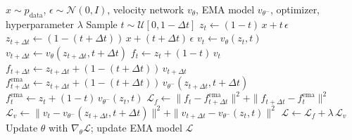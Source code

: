\begin{algorithm}[htbp]
\caption{Consistency Flow Matching Training}
\label{alg:consistency_fm}
\begin{algorithmic}[1]
\Require $x \sim p_{\text{data}}$, $\epsilon \sim \mathcal{N}(0,I)$, velocity network $v_\theta$, EMA model $v_{\theta^-}$, optimizer, hyperparameter $\lambda$
\State Sample $t \sim \mathcal{U}[0, 1 - \Delta t]$
\State $z_t \gets (1 - t) \, x + t \, \epsilon$
\State $z_{t+\Delta t} \gets (1 - (t+\Delta t)) \, x + (t+\Delta t) \, \epsilon$
\State $v_t \gets v_\theta(z_t, t)$
\State $v_{t+\Delta t} \gets v_\theta(z_{t+\Delta t}, t+\Delta t)$
\State $f_t \gets z_t + (1 - t) \, v_t$
\State $f_{t+\Delta t} \gets z_{t+\Delta t} + (1 - (t+\Delta t)) \, v_{t+\Delta t}$
\State {}
\State $f_{t+\Delta t}^{\text{ema}} \gets z_{t+\Delta t} + (1 - (t+\Delta t)) \, v_{\theta^-}(z_{t+\Delta t}, t+\Delta t)$
\State $f_t^{\text{ema}} \gets z_t + (1 - t) \, v_{\theta^-}(z_t, t)$
\State $\mathcal{L}_f \gets \| f_t - f_{t+\Delta t}^{\text{ema}} \|^2 + \| f_{t+\Delta t} - f_t^{\text{ema}} \|^2$
\State $\mathcal{L}_v \gets \| v_t - v_{\theta^-}(z_{t+\Delta t}, t+\Delta t) \|^2 + \| v_{t+\Delta t} - v_{\theta^-}(z_t, t) \|^2$
\State $\mathcal{L} \gets \mathcal{L}_f + \lambda \, \mathcal{L}_v$
\State Update $\theta$ with $\nabla_\theta \mathcal{L}$; update EMA model
\State \Return $\mathcal{L}$
\end{algorithmic}
\end{algorithm}
